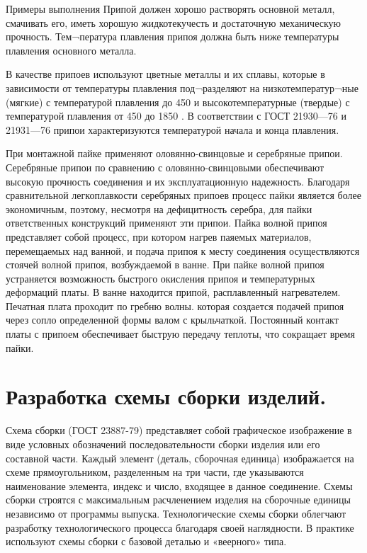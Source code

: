 \documentclass[unicode, 12pt, a4paper, oneside]{article}
\begin{document}
Примеры выполнения Припой должен хорошо растворять основной металл, смачивать его, иметь хорошую жидкотекучесть и достаточную механическую прочность. Тем¬пература плавления припоя должна быть ниже температуры плавления основного металла.

В качестве припоев используют цветные металлы и их сплавы, которые в зависимости от температуры плавления под¬разделяют на низкотемператур¬ные (мягкие) с температурой плавления до 450 \textcelsius и высокотемпературные (твердые) с температурой плавления от 450 до 1850 \textcelsius. В соответствии с ГОСТ 21930—76 и 21931—76 припои характеризуются температурой начала и конца плавления.

При монтажной пайке применяют оловянно-свинцовые и серебряные припои. Серебряные припои по сравнению с оловянно-свинцовыми обеспечивают высокую прочность соединения и их эксплуатационную надежность. Благодаря сравнительной легкоплавкости серебряных припоев процесс пайки является более экономичным, поэтому, несмотря на дефицитность серебра, для пайки ответственных конструкций применяют эти припои. Пайка волной припоя представляет собой процесс, при котором нагрев паяемых материалов, перемещаемых над ванной, и подача припоя к месту соединения осуществляются стоячей волной припоя, возбуждаемой в ванне. При пайке волной припоя устраняется возможность быстрого окисления припоя и температурных деформаций платы. В ванне находится припой, расплавленный нагревателем. Печатная плата  проходит по гребню волны. которая создается подачей припоя через сопло определенной формы валом с крыльчаткой. Постоянный контакт платы с припоем обеспечивает быструю передачу теплоты, что сокращает время пайки.


\section{Разработка схемы сборки изделий.}

Схема сборки (ГОСТ 23887-79) представляет собой графическое изображение в виде условных обозначений последовательности сборки изделия или его составной части. Каждый элемент (деталь, сборочная единица) изображается на схеме прямоугольником, разделенным на три части, где указываются наименование элемента, индекс и число, входящее в данное соединение. Схемы сборки строятся с максимальным расчленением изделия на сборочные единицы независимо от программы выпуска. Технологические схемы сборки облегчают разработку технологического процесса благодаря своей наглядности. В практике используют схемы сборки с базовой деталью и «веерного» типа. 
\end{document}

